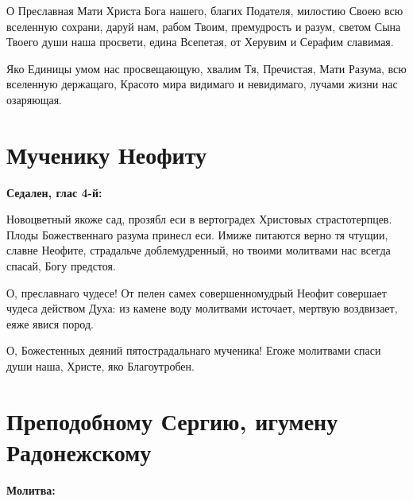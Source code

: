
О Преславная Мати Христа Бога нашего, благих Подателя, милостию Своею всю вселенную сохрани, даруй нам, рабом Твоим, премудрость и разум, светом Сына Твоего души наша просвети, едина Всепетая, от Херувим и Серафим славимая.



Яко Единицы умом нас просвещающую, хвалим Тя, Пречистая, Мати Разума, всю вселенную держащаго, Красото мира видимаго и невидимаго, лучами жизни нас озаряющая.
\shortpage[2]{}

\section{Мученику Неофиту}
 
\bfseries Седален, глас 4-й:\normalfont{}


Новоцветный якоже сад, прозябл еси в вертоградех Христовых страстотерпцев. Плоды Божественнаго разума принесл еси. Имиже питаются верно тя чтущии, славне Неофите, страдальче доблемудренный, но твоими молитвами нас всегда спасай, Богу предстоя.




О, преславнаго чудесе! От пелен самех совершенномудрый Неофит совершает чудеса действом Духа: из камене воду молитвами источает, мертвую воздвизает, еяже явися пород.

О, Божестенных деяний пятострадальнаго мученика! Егоже молитвами спаси души наша, Христе, яко Благоутробен.

\section{Преподобному Сергию, игумену Радонежскому}
 
\bfseries Молитва:\normalfont{}


